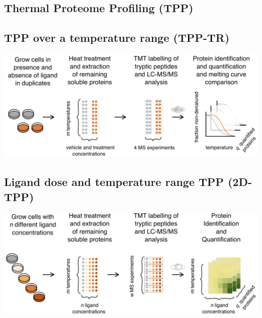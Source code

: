 \documentclass{article}
\begin{document}
\setlength{\columnsep}{0.5cm}
\begin{multicols}{2}

\noindent
\begin{minipage}[t]{\linewidth}
  \vspace{0.5cm}
  \section*{\huge Thermal Proteome Profiling (TPP)}
  \subsection*{TPP over a temperature range (TPP-TR) \cite{savitski_2014}}
  \includegraphics[width=\linewidth]{figs/tpp-tr_schematic.png}
  \subsection*{Ligand dose and temperature range TPP (2D-TPP) \cite{becher_2016}}
  \includegraphics[width=\linewidth]{figs/2d-tpp_schematic.png}


\end{minipage}
\end{multicols}
\end{document}
